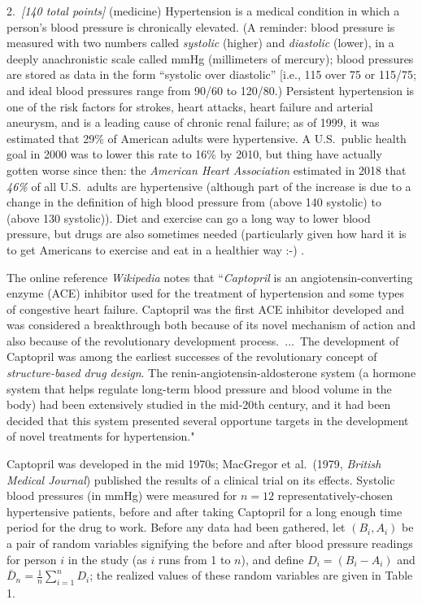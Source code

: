\documentclass[12pt]{article}
\begin{document}
2.~\textit{[140 total points]} (medicine) Hypertension is a medical
condition in which a person's blood pressure is chronically elevated. (A reminder: blood pressure is measured with two numbers called \textit{systolic} (higher) and \textit{diastolic} (lower), in a deeply anachronistic scale called mmHg (millimeters of mercury); blood pressures are stored as data in the form ``systolic over diastolic'' [i.e., 115 over 75 or 115/75; and ideal blood pressures range from 90/60 to 120/80.) Persistent
hypertension is one of the risk factors for strokes, heart attacks, heart
failure and arterial aneurysm, and is a leading cause of chronic renal
failure; as of 1999, it was estimated that 29\% of American adults were
hypertensive. A U.S.~public health goal in 2000 was to lower this rate
to 16\% by 2010, but thing have actually gotten worse since then: the \textit{American Heart Association} estimated in 2018 that \textit{46\%} of all U.S.~adults are hypertensive (although part of the increase is due to a change in the definition of high blood pressure from (above 140 systolic) to (above 130 systolic)). Diet and exercise can go
a long way to lower blood pressure, but drugs are also sometimes needed
(particularly given how hard it is to get Americans to exercise and eat in
a healthier way :-) .

The online reference \textit{Wikipedia} notes that ``\textit{Captopril} is
an angiotensin-converting enzyme (ACE) inhibitor used for the treatment of
hypertension and some types of congestive heart failure. Captopril was the
first ACE inhibitor developed and was considered a breakthrough both
because of its novel mechanism of action and also because of the
revolutionary development process.~...~The development of Captopril was
among the earliest successes of the revolutionary concept of
\textit{structure-based drug design}. The renin-angiotensin-aldosterone
system (a hormone system that helps regulate long-term blood pressure and
blood volume in the body) had been extensively studied in the mid-20th
century, and it had been decided that this system presented several
opportune targets in the development of novel treatments for
hypertension." 

Captopril was developed in the mid 1970s; MacGregor et al.~(1979,
\textit{British Medical Journal}) published the results of a clinical trial
on its effects. Systolic blood pressures (in mmHg) were measured for $n =
12$ representatively-chosen hypertensive patients, before and after taking
Captopril for a long enough time period for the drug to work. Before any data had been gathered, let $( B_i, A_i )$ be a pair of random variables signifying the before and after blood pressure readings for person $i$ in the study (as $i$ runs from 1 to $n$), and define $D_i = ( B_i - A_i )$ and $\bar{ D }_n = \frac{ 1 }{ n } \sum_{ i = 1 }^n D_i$; the realized values of these random variables are given in Table 1.
\end{document}
